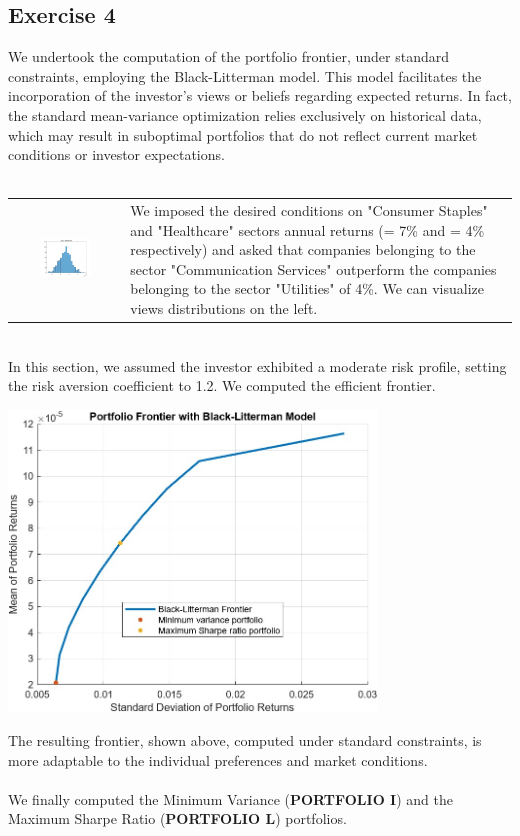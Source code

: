 \documentclass{assignment}
\begin{document}
\subsection*{Exercise 4}
We undertook the computation of the portfolio frontier, under standard constraints, employing the
Black-Litterman model. This model facilitates the incorporation of the investor's views or beliefs
regarding expected returns. In fact, the standard mean-variance optimization relies exclusively on
historical data, which may result in suboptimal portfolios that do not reflect current market
conditions or investor expectations.\\
\\
\begin{tabular}{c m{}}
    \includegraphics[width=0.50\textwidth, valign=c]{assets/Views_distr.jpg}
    &
    We imposed the desired conditions on "Consumer Staples" and "Healthcare" sectors annual returns
    (= 7\% and = 4\% respectively) and asked that companies belonging to the sector "Communication
    Services" outperform the companies belonging to the sector "Utilities" of 4\%. We can visualize
    views distributions on the left. 
\end{tabular} 
\\
In this section, we assumed the investor exhibited a moderate risk profile, setting the risk
aversion coefficient to 1.2. We computed the efficient frontier.

\begin{center}
    \includegraphics[height=8cm]
    {assets/frontierBL.jpg}
\end{center}
The resulting frontier, shown above, computed under standard constraints, is more adaptable to the
individual preferences and market conditions. 
\\\\
We finally computed the Minimum Variance (\textbf{PORTFOLIO I}) and the Maximum Sharpe Ratio
(\textbf{PORTFOLIO L}) portfolios. 
\end{document}

